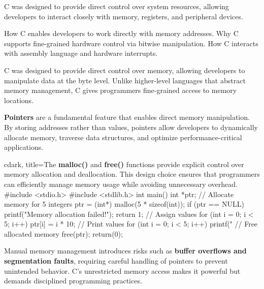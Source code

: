 \begin{NxSSSBox}
	\begin{NxIDBox}
		C was designed to provide direct control over system resources, allowing developers to interact closely with memory, registers, and peripheral devices.
	\end{NxIDBox}
	\begin{NxIDBoxL}
		 How C enables developers to work directly with memory addresses.
		 Why C supports fine-grained hardware control via bitwise manipulation.
		 How C interacts with assembly language and hardware interrupts.
	\end{NxIDBoxL}
\end{NxSSSBox}

\begin{NxSSSSBox}
	\begin{NxIDBox}
		C was designed to provide direct control over memory, allowing developers to manipulate data at the byte level. Unlike higher-level languages that abstract memory management, C gives programmers fine-grained access to memory locations.
	\end{NxIDBox}
	\begin{NxIDBox}
		\textbf{Pointers} are a fundamental feature that enables direct memory manipulation. By storing addresses rather than values, pointers allow developers to dynamically allocate memory, traverse data structures, and optimize performance-critical applications.
	\end{NxIDBox}
	\begin{NxCodeBox}{c}{dark, title={The \textbf{malloc()} and \textbf{free()} functions provide explicit control over memory allocation and deallocation. This design choice ensures that programmers can efficiently manage memory usage while avoiding unnecessary overhead.}}
		#include <stdio.h>
		#include <stdlib.h>
		int main() {
			int *ptr;
			// Allocate memory for 5 integers
			ptr = (int*) malloc(5 * sizeof(int));
			if (ptr == NULL) {
				printf("Memory allocation failed!\n");
				return 1;
			}
			// Assign values
			for (int i = 0; i < 5; i++) {
				ptr[i] = i * 10;
			}
			// Print values
			for (int i = 0; i < 5; i++) {
				printf("%
			}
			// Free allocated memory
			free(ptr);
			return(0);
		}
	\end{NxCodeBox}
	\begin{NxIDBox}
		Manual memory management introduces risks such as \textbf{buffer overflows and segmentation faults}, requiring careful handling of pointers to prevent unintended behavior. C’s unrestricted memory access makes it powerful but demands disciplined programming practices.
	\end{NxIDBox}
\end{NxSSSSBox}

